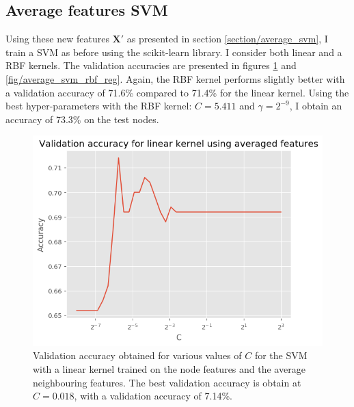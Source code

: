 \documentclass[12pt]{article}
\theoremstyle{definition}
\begin{document}
\subsection{Average features SVM}
Using these new features $\mathbf{X}'$ as presented in section \ref{section/average_svm}, I train a SVM as before using the scikit-learn library. I consider both linear and a RBF kernels. The validation accuracies are presented in figures \ref{fig/average_svm_linear_reg} and \ref{fig/average_svm_rbf_reg}. Again, the RBF kernel performs slightly better with a validation accuracy of 71.6\% compared to 71.4\% for the linear kernel. Using the best hyper-parameters with the RBF kernel: $C=5.411$ and $\gamma = 2^{-9}$, I obtain an accuracy of 73.3\% on the test nodes.

\begin{figure}[h]
	\includegraphics[width=1.0\textwidth]{average_svm/linear_reg}
	\centering
	\caption{Validation accuracy obtained for various values of $C$ for the SVM with a linear kernel trained on the node features and the average neighbouring features. The best validation accuracy is obtain at $C=0.018$, with a validation accuracy of 7.14\%.}
	\label{fig/average_svm_linear_reg}
\end{figure}
\end{document}
